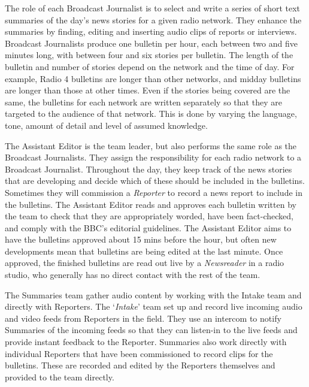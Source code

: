 The role of each Broadcast Journalist is to select and write a series of short text summaries of the day's news stories
for a given radio network.  They enhance the summaries by finding, editing and inserting audio clips of reports or
interviews.  Broadcast Journalists produce one bulletin per hour, each between two and five minutes long, with between
four and six stories per bulletin.  The length of the bulletin and number of stories depend on the network and the time
of day. For example, Radio 4 bulletins are longer than other networks, and midday bulletins are longer than those at
other times. Even if the stories being covered are the same, the bulletins for each network are written separately so
that they are targeted to the audience of that network.  This is done by varying the language, tone, amount of detail
and level of assumed knowledge.

The Assistant Editor is the team leader, but also performs the same role as the Broadcast Journalists. They assign the
responsibility for each radio network to a Broadcast Journalist. Throughout the day, they keep track of the news
stories that are developing and decide which of these should be included in the bulletins. Sometimes they will
commission a \textit{Reporter} to record a news report to include in the bulletins. The Assistant Editor reads and
approves each bulletin written by the team to check that they are appropriately worded, have been fact-checked, and
comply with the BBC's editorial guidelines.  The Assistant Editor aims to have the bulletins approved about 15 mins
before the hour, but often new developments mean that bulletins are being edited at the last minute.  Once approved,
the finished bulletins are read out live by a \textit{Newsreader} in a radio studio, who generally has no direct
contact with the rest of the team.

The Summaries team gather audio content by working with the Intake team and directly with Reporters. The
`\textit{Intake}' team set up and record live incoming audio and video feeds from Reporters in the field. They use an
intercom to notify Summaries of the incoming feeds so that they can listen-in to the live feeds and provide instant
feedback to the Reporter.  Summaries also work directly with individual Reporters that have been commissioned to record
clips for the bulletins. These are recorded and edited by the Reporters themselves and provided to the team directly.

